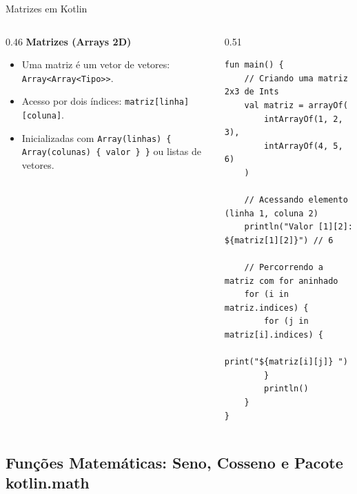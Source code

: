 \documentclass[aspectratio=169]{beamer}
\begin{document}
\begin{frame}[fragile,shrink=5]{Matrizes em Kotlin}
  \begin{columns}[T]
    \begin{column}{0.46\textwidth}
      \textbf{Matrizes (Arrays 2D)}
      \vspace{0.3em}
      \begin{itemize}\small
        \item Uma matriz é um vetor de vetores: \texttt{Array<Array<Tipo>>}.
        \item Acesso por dois índices: \texttt{matriz[linha][coluna]}.
        \item Inicializadas com \texttt{Array(linhas) \{ Array(colunas) \{ valor \} \}} ou listas de vetores.
      \end{itemize}
    \end{column}
    \begin{column}{0.51\textwidth}
\begin{lstlisting}[style=KotlinStyle]
fun main() {
    // Criando uma matriz 2x3 de Ints
    val matriz = arrayOf(
        intArrayOf(1, 2, 3),
        intArrayOf(4, 5, 6)
    )

    // Acessando elemento (linha 1, coluna 2)
    println("Valor [1][2]: ${matriz[1][2]}") // 6

    // Percorrendo a matriz com for aninhado
    for (i in matriz.indices) {
        for (j in matriz[i].indices) {
            print("${matriz[i][j]} ")
        }
        println()
    }
}
\end{lstlisting}
    \end{column}
  \end{columns}
\end{frame}

\subsection{Funções Matemáticas: Seno, Cosseno e Pacote kotlin.math}
\end{document}
